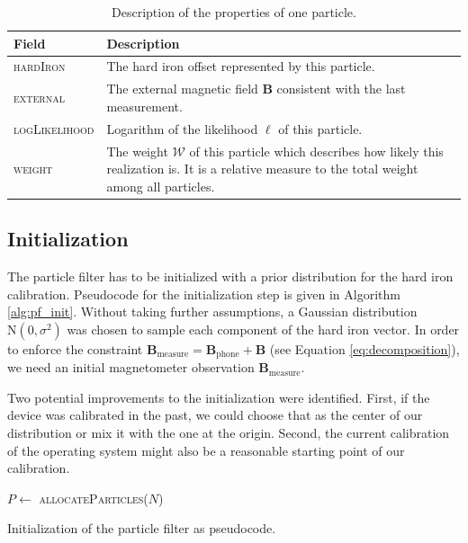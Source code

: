 \begin{table}[h]
    \centering
    \begin{tabular}{ | l | p{10cm} | }
    \hline
    \textbf{Field}             & \textbf{Description} \\ \hline
    \textsc{hardIron}          & The hard iron offset represented by this particle. \\ \hline
    \textsc{external}          & The external magnetic field $\bm{B}$ consistent with the last measurement. \\ \hline
    \textsc{logLikelihood}     & Logarithm of the likelihood $\ell$ of this particle. \\ \hline
    \textsc{weight}            & The weight $\mathcal{W}$ of this particle which describes how likely this realization is. It is a relative measure to the total weight among all particles. \\ \hline
    \end{tabular}
    \caption{Description of the properties of one particle.}
    \label{tbl:one_particle}
\end{table}

\subsection{Initialization}

The particle filter has to be initialized with a prior distribution for the hard iron calibration. Pseudocode for the initialization step is given in Algorithm \ref{alg:pf_init}. Without taking further assumptions, a Gaussian distribution $\text{N}(0, \sigma^2)$ was chosen to sample each component of the hard iron vector. In order to enforce the constraint $\bm{B}_\text{measure} = \bm{B}_\text{phone} + \bm{B}$ (see Equation \ref{eq:decomposition}), we need an initial magnetometer observation $\bm{B}_\text{measure}$.

Two potential improvements to the initialization were identified. First, if the device was calibrated in the past, we could choose that as the center of our distribution or mix it with the one at the origin. Second, the current calibration of the operating system might also be a reasonable starting point of our calibration.

\begin{algorithm}[h]
	$P \leftarrow$ \textsc{allocateParticles}($N$)\\
	\caption{Initialization of the particle filter as pseudocode.}
	\label{alg:pf_init}
\end{algorithm}

